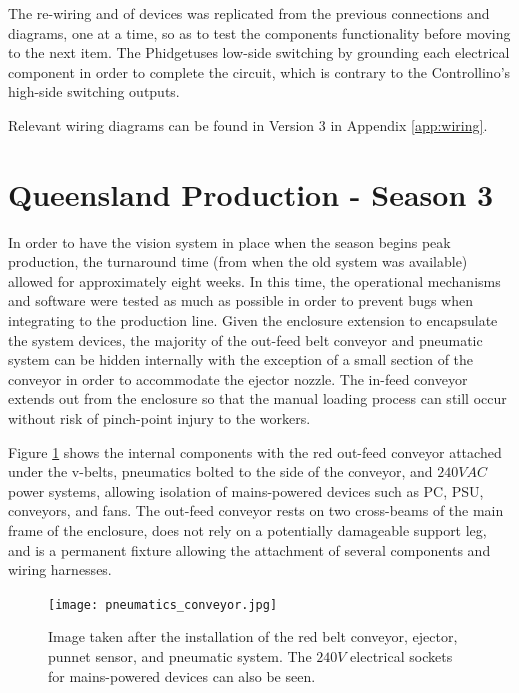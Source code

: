 \documentclass[fleqn,twoside,12pt]{report}
\begin{document}
The re-wiring and of devices was replicated from the previous connections and diagrams, one at a time, so as to test the components functionality before moving to the next item. The Phidget\texttrademark uses low-side switching by grounding each electrical component in order to complete the circuit, which is contrary to the Controllino\texttrademark's high-side switching outputs. 

Relevant wiring diagrams can be found in Version 3 in Appendix \ref{app:wiring}.


\section{Queensland Production - Season 3}


In order to have the vision system in place when the season begins peak production, the turnaround time (from when the old system was available) allowed for approximately eight weeks. In this time, the operational mechanisms and software were tested as much as possible in order to prevent bugs when integrating to the production line. Given the enclosure extension to encapsulate the system devices, the majority of the  out-feed belt conveyor and pneumatic system can be hidden internally with the exception of a small section of the conveyor in order to accommodate the ejector nozzle. The in-feed conveyor extends out from the enclosure so that the manual loading process can still occur without risk of pinch-point injury to the workers.

Figure \ref{fig:pneumatics_conveyor} shows the internal components with the red out-feed conveyor attached under the v-belts, pneumatics bolted to the side of the conveyor, and $240VAC$ power systems, allowing isolation of mains-powered devices such as PC, PSU, conveyors, and fans. The out-feed conveyor rests on two cross-beams of the main frame of the enclosure, does not rely on a potentially damageable support leg, and is a permanent fixture allowing the attachment of several components and wiring harnesses. 


\begin{figure}
	\begin{center}
		\texttt{[image: pneumatics\_conveyor.jpg]}
	\end{center}
	\caption{Image taken after the installation of the red belt conveyor, ejector, punnet sensor, and pneumatic system. The $240V$ electrical sockets for mains-powered devices can also be seen.}
	\label{fig:pneumatics_conveyor}
\end{figure} 
\end{document}
